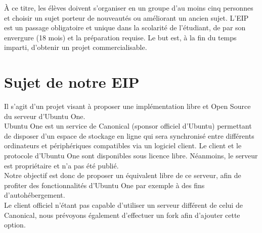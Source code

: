 \documentclass[12pt]{report}
\begin{document}
À ce titre, les élèves doivent s'organiser en un groupe d'au moins cinq personnes et choisir un sujet porteur de nouveautés ou améliorant un ancien sujet. L'EIP est un passage obligatoire et unique dans la scolarité de l'étudiant, de par son envergure (18 mois) et la préparation requise. Le but est, à la fin du temps imparti, d'obtenir un projet commercialisable.


\section{Sujet de notre EIP}
    Il s’agit d’un projet visant à proposer une implémentation libre et Open Source du serveur d’Ubuntu One.\\

    Ubuntu One est un service de Canonical (sponsor officiel d'Ubuntu) permettant de disposer d’un espace de stockage en ligne qui sera synchronisé entre différents ordinateurs et périphériques compatibles via un logiciel client. Le client et le protocole d’Ubuntu One sont disponibles sous licence libre. Néanmoins, le serveur est propriétaire et n’a pas été publié.\\


    Notre objectif est donc de proposer un équivalent libre de ce serveur, afin
    de profiter des fonctionnalités d’Ubuntu One par exemple à des fins d’autohébergement.\\

    Le client officiel n’étant pas capable d’utiliser un serveur différent de celui
    de Canonical, nous prévoyons également d'effectuer un fork afin d'ajouter cette option.

\thispagestyle{EIP} %




\end{document}
